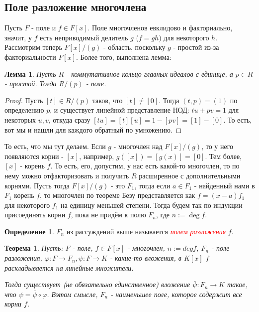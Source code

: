 \documentclass[a4paper,100pt]{article}
\theoremstyle{indented}
\newtheorem{theorem}{Теорема}
\newtheorem{lemma}{Лемма}
\theoremstyle{definition}
\newtheorem{defn}{Определение}
\theoremstyle{remark}
\begin{document}
\resetall

\subsection{Поле разложение многочлена}

Пусть $F$ - поле и $f\in F[x]$. Поле многочленов евклидово и факториально, значит, у $f$ есть неприводимый делитель $g$ ($f=gh$) для некоторого $h$. Рассмотрим теперь  $F[x]/(g)$ - область, поскольку $g$ - простой из-за факториальности $F[x]$. Более того, выполнена лемма:\\

\begin{lemma}
    Пусть $R$ - коммутативное кольцо главных идеалов с единице, а $p\in R$ - простой. Тогда $R/(p)$ - поле. 
\end{lemma}

\begin{proof}
    Пусть $[t]\in R/(p)$ таков, что $[t]\neq [0]$. Тогда $(t, p)=(1)$ по определению $p$, и существует линейной представление НОД: $tu+pv=1$ для некоторых $u, v$, откуда сразу $[tu]=[t][u]=1-[pv]=[1]-[0]$. То есть, вот мы и нашли для каждого обратный по умножению.
\end{proof}

То есть, что мы тут делаем. Если $g$ - многочлен над $F[x]/(g)$, то у него появляются корни - $[x]$, например, $g([x])=[g(x)]=[0]$. Тем более, $[x]$ - корень $f$. То есть, его, допустим, у нас есть какой-то многочлен, то по нему можно отфакторизовать и получить $R$ расширенное с дополнительными корнями. Пусть тогда $F[x]/(g)$ - это $F_1$, тогда если $a\in F_1$ - найденный нами в $F_1$ корень $f$, то многочлен по теореме Безу представляется как $f=(x-a)f_1$ для некоторого $f_1$ на единицу меньшей степени. Тогда будем так по индукции присоединять корни $f$, пока не придём к полю $F_n$, где $n:=\deg f$.

\begin{defn}
    $F_n$ из рассуждений выше называется \hypertarget{n37}{\textcolor{red}{\textit{полем разложения}}} $f$.
\end{defn}

\begin{theorem}
    Пусть: $F$ - поле, $f\in F[x]$ - многочлен, $n:=deg f$, $F_n$ - поле разложения, $\varphi: F\rightarrow F_n, \psi : F\rightarrow K$ - какие-то вложения, в $K[x]$ $f$ раскладывается на линейные множители.\ 

    Тогда существует (не обязательно единственное) вложение $\bar{\psi}:F_n\rightarrow K$ такое, что $\psi=\bar{\psi}\circ \varphi$. Вэтом смысле, $F_n$ - наименьшее поле, которое содержит все корни $f$.
\end{theorem}
\end{document}
